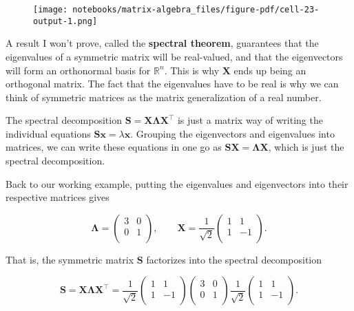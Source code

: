 \documentclass[
  letterpaper,
  DIV=11,
  numbers=noendperiod]{scrreprt}
\begin{document}
\begin{figure}[H]

{\centering \texttt{[image: notebooks/matrix-algebra\_files/figure-pdf/cell-23-output-1.png]}

}

\end{figure}

A result I won't prove, called the \textbf{spectral theorem}, guarantees
that the eigenvalues of a symmetric matrix will be real-valued, and that
the eigenvectors will form an orthonormal basis for \(\mathbb{R}^n\).
This is why \(\mathbf{X}\) ends up being an orthogonal matrix. The fact
that the eigenvalues have to be real is why we can think of symmetric
matrices as the matrix generalization of a real number.

The spectral decomposition \(\mathbf{S} = \mathbf{X \Lambda X}^\top\) is
just a matrix way of writing the individual equations
\(\mathbf{S}\mathbf{x} = \lambda \mathbf{x}\). Grouping the eigenvectors
and eigenvalues into matrices, we can write these equations in one go as
\(\mathbf{S}\mathbf{X} = \mathbf{\Lambda} \mathbf{X}\), which is just
the spectral decomposition.

Back to our working example, putting the eigenvalues and eigenvectors
into their respective matrices gives

\[
\mathbf{\Lambda} = 
\begin{pmatrix}
3 & 0 \\
0 & 1 \\
\end{pmatrix}, \qquad
\mathbf{X} = 
\frac{1}{\sqrt{2}}
\begin{pmatrix}
1 & 1 \\
1 & -1 \\
\end{pmatrix}.
\]

That is, the symmetric matrix \(\mathbf{S}\) factorizes into the
spectral decomposition

\[
\mathbf{S} = \mathbf{X \Lambda X}^\top = 
\frac{1}{\sqrt{2}}
\begin{pmatrix}
1 & 1 \\
1 & -1 \\
\end{pmatrix}
\begin{pmatrix}
3 & 0 \\
0 & 1 \\
\end{pmatrix}
\frac{1}{\sqrt{2}}
\begin{pmatrix}
1 & 1 \\
1 & -1 \\
\end{pmatrix}.
\]
\end{document}

